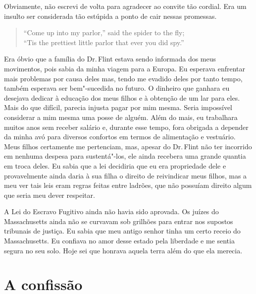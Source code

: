 Obviamente, não escrevi de volta para
agradecer ao convite tão cordial. Era um insulto ser considerada tão
estúpida a ponto de cair nessas promessas.

\begin{verse}
``Come up into my parlor,'' said the spider to \qb{}the fly;\\
``Tis the prettiest little parlor that ever you did \qb{}spy.''\footnotemark
\end{verse}

Era óbvio que a família do Dr.\,Flint
estava sendo informada dos meus movimentos, pois sabia da minha viagem
para a Europa. Eu esperava enfrentar mais problemas por causa deles mas,
tendo me evadido deles por tanto tempo, também esperava ser bem"-sucedida
no futuro. O dinheiro que ganhara eu desejava dedicar à educação dos
meus filhos e à obtenção de um lar para eles. Mais do que difícil,
parecia injusta pagar por mim mesma. Seria impossível considerar a mim
mesma uma posse de alguém. Além do mais, eu trabalhara muitos anos sem
receber salário e, durante esse tempo, fora obrigada a depender da minha
avó para diversos confortos em termos de alimentação e vestuário. Meus
filhos certamente me pertenciam, mas, apesar do Dr.\,Flint não ter
incorrido em nenhuma despesa para sustentá"-los, ele ainda recebera uma
grande quantia em troca deles. Eu sabia que a lei decidiria que eu era
propriedade dele e provavelmente ainda daria à sua filha o direito de
reivindicar meus filhos, mas a meu ver tais leis eram regras feitas
entre ladrões, que não possuíam direito algum que seria meu dever
respeitar.

A Lei do Escravo Fugitivo ainda não
havia sido aprovada. Os juízes do Massachusetts ainda não se curvavam
sob grilhões para entrar nos supostos tribunais de justiça. Eu sabia que
meu antigo senhor tinha um certo receio do Massachusetts. Eu confiava no
amor desse estado pela liberdade e me sentia segura no seu solo. Hoje
sei que honrava aquela terra além do que ela merecia.

\chapter*{A confissão}

